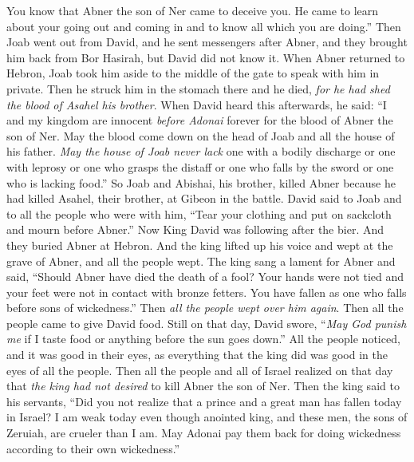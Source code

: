 \begin{biblechapter}
\verse You know that Abner the son of Ner came to deceive you. He came to learn about your going out and coming in and to know all which you are doing.”
\verse Then Joab went out from David, and he sent messengers after Abner, and they brought him back from Bor Hasirah, but David did not know it.
\verse When Abner returned to Hebron, Joab took him aside to the middle of the gate to speak with him in private. Then he struck him in the stomach there and he died, \textit{for he had shed the blood of Asahel his brother}.
\verse When David heard this afterwards, he said: “I and my kingdom are innocent \textit{before Adonai} forever for the blood of Abner the son of Ner.
\verse May the blood come down on the head of Joab and all the house of his father. \textit{May the house of Joab never lack} one with a bodily discharge or one with leprosy or one who grasps the distaff or one who falls by the sword or one who is lacking food.”
\verse So Joab and Abishai, his brother, killed Abner because he had killed Asahel, their brother, at Gibeon in the battle.
\verse David said to Joab and to all the people who were with him, “Tear your clothing and put on sackcloth and mourn before Abner.” Now King David was following after the bier.
\verse And they buried Abner at Hebron. And the king lifted up his voice and wept at the grave of Abner, and all the people wept.
\verse The king sang a lament for Abner and said, “Should Abner have died the death of a fool?
\verse Your hands were not tied and your feet were not in contact with bronze fetters. You have fallen as one who falls before sons of wickedness.” Then \textit{all the people wept over him again}.
\verse Then all the people came to give David food. Still on that day, David swore, “\textit{May God punish me} if I taste food or anything before the sun goes down.”
\verse All the people noticed, and it was good in their eyes, as everything that the king did was good in the eyes of all the people.
\verse Then all the people and all of Israel realized on that day that \textit{the king had not desired} to kill Abner the son of Ner.
\verse Then the king said to his servants, “Did you not realize that a prince and a great man has fallen today in Israel?
\verse I am weak today even though anointed king, and these men, the sons of Zeruiah, are crueler than I am. May Adonai pay them back for doing wickedness according to their own wickedness.”
\end{biblechapter}

